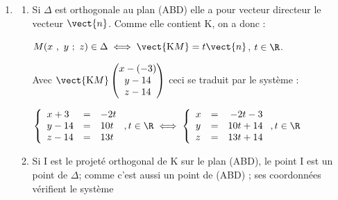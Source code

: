\begin{enumerate}
\begin{enumerate}
$\vect{n} \cdot \vect{\text{AB}} = - 10 + 10 + 0 = 0$ et $\vect{n} \cdot \vect{\text{AD}} = 2 + 50 - 52 = 0$.

Conclusion : le vecteur $\vect{n}$, orthogonal à deux vecteurs non colinéaires du plan (ABD), est normal à ce plan.
		\item %
Le résultat précédent montre que le plan (ABD) a une équation de la forme\\
$-2x + 10y + 13z = d$, avec $d \in \R$.

Or par exemple $\text{B}(2~;~2~;~3) \in (\text{ABD})$ donc \\
$-2 \times 2  + 10 \times 2  + 13\times 3 = d \iff - 4 + 20 + 39 = d \iff d = 55$.

Donc le plan (ABD) a pour équation $ -2x + 10y + 13z = 55$.
	\end{enumerate}
	
\item
	\begin{enumerate}
		\item %
Si $\Delta$ est orthogonale au plan (ABD) elle a pour vecteur directeur le vecteur $\vect{n}$. Comme elle contient K, on a donc :

$M(x~,~y~;~z) \in \Delta \iff \vect{\text{K}M} = t\vect{n}$, \: $t \in \R$. 

Avec $\vect{\text{K}M}\begin{pmatrix}x - (-3)\\y - 14\\z - 14\end{pmatrix}$ ceci se traduit par le système :

$\left\{\begin{array}{l c l}
x + 3&=&- 2t\\
y - 14&=&10t\\
z - 14&=&13t
\end{array}\right., t \in \R \iff \left\{\begin{array}{l c r}
x &=&- 2t - 3\\
y &=&10t + 14\\
z &=&13t + 14
\end{array}\right., t \in \R $
		\item %
Si I est le projeté orthogonal de K sur le plan (ABD), le point I est un point de $\Delta$; comme c'est aussi un point de (ABD) ; ses coordonnées vérifient  le système


\end{enumerate}
\end{enumerate}
